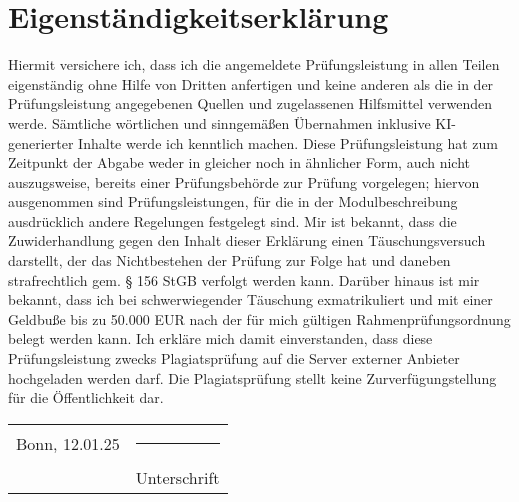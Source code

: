 \newpage
{} %

\section*{Eigenständigkeitserklärung}

\noindent Hiermit versichere ich, dass ich die angemeldete Prüfungsleistung in allen Teilen eigen\-ständig ohne Hilfe von Dritten anfertigen und keine anderen als die in der Prüfungsleis\-tung angegebenen Quellen und zugelassenen Hilfsmittel verwenden werde. Sämtliche wörtlichen und sinngemäßen Übernahmen inklusive KI-generierter Inhalte werde ich kenntlich machen. Diese Prüfungsleistung hat zum Zeitpunkt der Abgabe weder in glei\-cher noch in ähnlicher Form, auch nicht auszugsweise, bereits einer Prüfungsbehörde zur Prüfung vorgelegen; hiervon ausgenommen sind Prüfungsleistungen, für die in der Mo\-dulbeschreibung ausdrücklich andere Regelungen festgelegt sind. Mir ist bekannt, dass die Zuwiderhandlung gegen den Inhalt dieser Erklärung einen Täuschungsversuch dar\-stellt, der das Nichtbestehen der Prüfung zur Folge hat und daneben strafrechtlich gem. § 156 StGB verfolgt werden kann. Darüber hinaus ist mir bekannt, dass ich bei schwerwie\-gender Täuschung exmatrikuliert und mit einer Geldbuße bis zu 50.000 EUR nach der für mich gültigen Rahmenprüfungsordnung belegt werden kann. Ich erkläre mich damit ein\-verstanden, dass diese Prüfungsleistung zwecks Plagiatsprüfung auf die Server externer Anbieter hochgeladen werden darf. Die Plagiatsprüfung stellt keine Zurverfügungstellung für die Öffentlichkeit dar.

\vspace{2cm}

\noindent\begin{tabular}{@{}p{}@{}p{}@{}}
{\raggedleft Bonn, 12.01.25} & {\raggedright\rule{5cm}{0.4pt}} \\
& {\raggedright Unterschrift}
\end{tabular}



\vspace{5cm}

